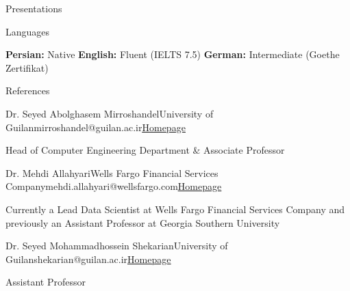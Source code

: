 \documentclass{resume} %
\begin{document}
\begin{rSection}{Presentations}

\end{rSection}

\begin{rSection}{Languages}

\textbf{Persian:} Native \qquad
\textbf{  English:} Fluent (IELTS 7.5) \qquad
\textbf{  German:} Intermediate (Goethe Zertifikat)

\end{rSection}


\begin{rSection}{References}

\begin{rSubsection}{Dr. Seyed Abolghasem Mirroshandel}{University of Guilan}{\normalfont mirroshandel@guilan.ac.ir}{\normalfont\underline{\href{https://staff.guilan.ac.ir/mirroshandel/?lg=1}{Homepage}}}
\item Head of Computer Engineering Department \& Associate Professor
\end{rSubsection}

\begin{rSubsection}{Dr. Mehdi Allahyari}{Wells Fargo Financial Services Company}{\normalfont mehdi.allahyari@wellsfargo.com}{\normalfont\underline{\href{https://sci2lab.github.io/mehdi/}{Homepage}}}
\item Currently a Lead Data Scientist at Wells Fargo Financial Services Company and previously an Assistant Professor at Georgia Southern University
\end{rSubsection}

\begin{rSubsection}{Dr. Seyed Mohammadhossein Shekarian}{University of Guilan}{\normalfont shekarian@guilan.ac.ir}{\normalfont\underline{\href{https://staff.guilan.ac.ir/shekarian/index.php?a=0&lg=1}{Homepage}}}
\item Assistant Professor
\end{rSubsection}

\end{rSection}


\end{document}

